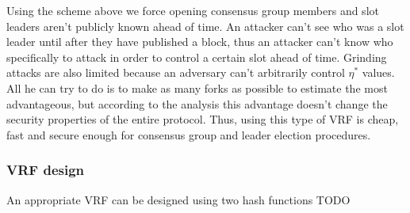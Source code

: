 Using the scheme above we force opening consensus group members and slot leaders aren't publicly known ahead of time.
An attacker can't see who was a slot leader until after they have published a block, thus an attacker can't know who specifically to attack in order to control a certain slot ahead of time.
Grinding attacks are also limited because an adversary can't arbitrarily control $\eta^*$ values.
All he can try to do is to make as many forks as possible to estimate the most advantageous, but according to the analysis this advantage doesn't change the security properties of the entire protocol.
Thus, using this type of VRF is cheap, fast and secure enough for consensus group and leader election procedures.

\subsubsection{VRF design}
An appropriate VRF can be designed using two hash functions
TODO

